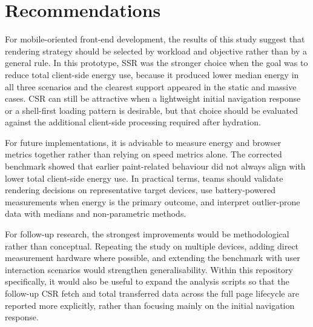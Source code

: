 \section{Recommendations}

For mobile-oriented front-end development, the results of this study suggest that rendering strategy should be selected by workload and objective rather than by a general rule. In this prototype, SSR was the stronger choice when the goal was to reduce total client-side energy use, because it produced lower median energy in all three scenarios and the clearest support appeared in the static and massive cases. CSR can still be attractive when a lightweight initial navigation response or a shell-first loading pattern is desirable, but that choice should be evaluated against the additional client-side processing required after hydration.

For future implementations, it is advisable to measure energy and browser metrics together rather than relying on speed metrics alone. The corrected benchmark showed that earlier paint-related behaviour did not always align with lower total client-side energy use. In practical terms, teams should validate rendering decisions on representative target devices, use battery-powered measurements when energy is the primary outcome, and interpret outlier-prone data with medians and non-parametric methods.

For follow-up research, the strongest improvements would be methodological rather than conceptual. Repeating the study on multiple devices, adding direct measurement hardware where possible, and extending the benchmark with user interaction scenarios would strengthen generalisability. Within this repository specifically, it would also be useful to expand the analysis scripts so that the follow-up CSR fetch and total transferred data across the full page lifecycle are reported more explicitly, rather than focusing mainly on the initial navigation response.
